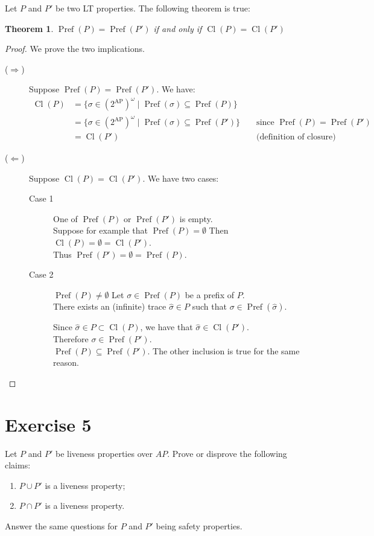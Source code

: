 \documentclass[11pt,a4paper]{article}
\newtheorem*{theorem}{Theorem}
\DeclareMathOperator{\Pref}{Pref}
\DeclareMathOperator{\Cl}{Cl}
\begin{document}
\begin{Answer}[number=4]
  Let $P$ and $P'$ be two LT properties. The following theorem is true:
  \begin{theorem}
    $\Pref(P) = \Pref(P')$ if and only if $\Cl(P) = \Cl(P')$
  \end{theorem}
  \begin{proof}
    We prove the two implications.
    \begin{description}
      \item[($\Rightarrow$)]
        Suppose $\Pref(P) = \Pref(P')$. We have:
        \begin{align*}
          \Cl(P) &= \{\sigma\in{(2^{\textrm{AP}})}^\omega \mid \Pref(\sigma)\subseteq\Pref(P)\}\\
          &= \{\sigma\in{(2^{\textrm{AP}})}^\omega \mid \Pref(\sigma)\subseteq\Pref(P')\} &&\text{ since }\Pref(P) = \Pref(P')\\
          &= \Cl(P')&&\text{ (definition of closure)}
        \end{align*}
      \item[($\Leftarrow$)]
        Suppose $\Cl(P) = \Cl(P')$. We have two cases:
        \begin{description}
          \item[Case 1] One of $\Pref(P)$ or $\Pref(P')$ is empty.\\
          Suppose for example that $\Pref(P) = \emptyset$ Then $\Cl(P) = \emptyset = \Cl(P')$.\\
          Thus $\Pref(P') = \emptyset = \Pref(P)$.
          \item[Case 2] $\Pref(P) \neq \emptyset$
          Let $\sigma\in\Pref(P)$ be a prefix of $P$. \\
          There exists an (infinite) trace $\hat{\sigma} \in P$ such that $\sigma\in\Pref(\hat{\sigma})$.

          Since $\hat{\sigma}\in P\subset\Cl(P)$, we have that $\hat{\sigma}\in\Cl(P')$. \\
          Therefore $\sigma\in\Pref(P')$.\\
          $\Pref(P)\subseteq\Pref(P')$. The other inclusion is true for the same reason.

        \end{description}
    \end{description}
  \end{proof}
\end{Answer}

\section*{Exercise 5}
Let $P$ and $P'$ be liveness properties over $AP$. Prove or disprove the following claims:
\begin{enumerate}
\item $P \cup P'$ is a liveness property;
\item $P \cap P'$ is a liveness property.
\end{enumerate}
Answer the same questions for $P$ and $P'$ being safety properties.
\end{document}
